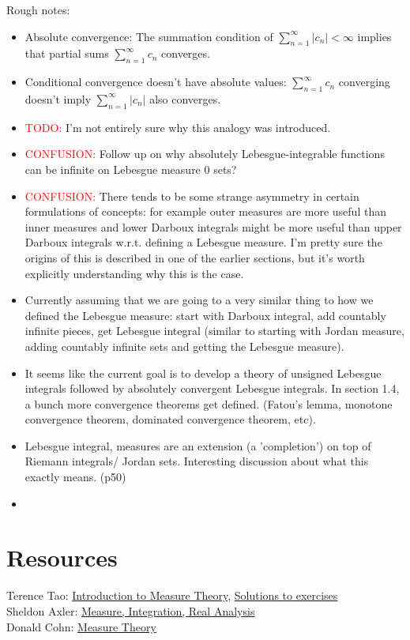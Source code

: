 \documentclass[answers,12pt]{exam}
\begin{document}
Rough notes:
\begin{itemize}[noitemsep]
    \item Absolute convergence: The summation condition of $\sum_{n=1}^{\infty}|c_n| < \infty$ implies that partial sums $\sum_{n=1}^{\infty} c_n$ converges.
    \item Conditional convergence doesn't have absolute values: $\sum_{n=1}^{\infty}c_n$ converging doesn't imply $\sum_{n=1}^{\infty}|c_n|$ also converges.
    \item \textcolor{red}{TODO:} I'm not entirely sure why this analogy was introduced.
    \item \textcolor{red}{CONFUSION:} Follow up on why absolutely Lebesgue-integrable functions can be infinite on Lebesgue measure 0 sets?
    \item \textcolor{red}{CONFUSION:} There tends to be some strange asymmetry in certain formulations of concepts: 
    for example outer measures are more useful than inner measures and lower Darboux integrals might be more useful than upper Darboux integrals w.r.t. defining a Lebesgue measure.
    I'm pretty sure the origins of this is described in one of the earlier sections, but it's worth explicitly understanding why this is the case.
    \item Currently assuming that we are going to a very similar thing to how we defined the Lebesgue measure: start with Darboux integral, add countably infinite pieces, get Lebesgue integral (similar to starting with Jordan measure, adding countably infinite sets and getting the Lebesgue measure).
    \item It seems like the current goal is to develop a theory of unsigned Lebesgue integrals followed by absolutely convergent Lebesgue integrals.
    In section 1.4, a bunch more convergence theorems get defined. 
    (Fatou's lemma, monotone convergence theorem, dominated convergence theorem, etc).
    \item Lebesgue integral, measures are an extension (a 'completion') on top of Riemann integrals/ Jordan sets.
    Interesting discussion about what this exactly means. (p50)
    \item
\end{itemize}

\section{Resources}
Terence Tao: \href{https://terrytao.files.wordpress.com/2012/12/gsm-126-tao5-measure-book.pdf}{Introduction to Measure Theory}, \href{https://math.solverer.com/library/terence_tao/an_introduction_to_measure_theory}{Solutions to exercises}\\
Sheldon Axler: \href{https://measure.axler.net/MIRA.pdf}{Measure, Integration, Real Analysis}\\
Donald Cohn: \href{https://www.fayoum.edu.eg/stfsys/stfFiles/273/1342/Measure%20Theory%20(2nd%20ed.)%20-%20Cohn,%20Donald%20L._5990.pdf}{Measure Theory}
\end{document}
